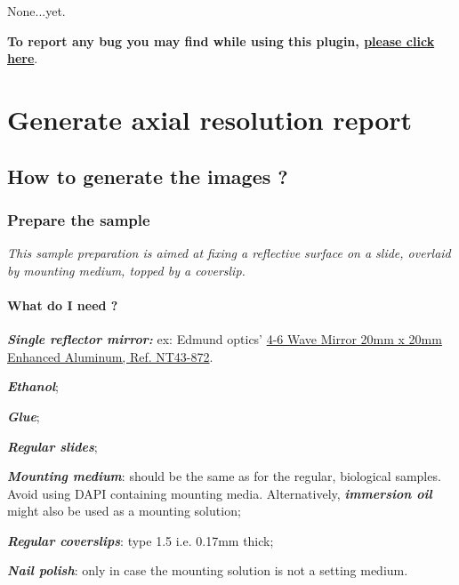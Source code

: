 \documentclass[a4paper, 11pt]{report}%
\makeatletter
\newcommand{\mailbug}{\begin{center}\textbf{To report any bug you may find while using this plugin, \href{mailto:fabrice.cordelieres@gmail.com,cedric.matthews@ibdml.univ-mrs.fr ?subject=Bug\%20found\%20in\%20MetroloJ&body=\%0ABug\%20description:\%0A\%0AHow\%20did\%20it\%20happen:\%0A\%0ACopy/Paste\%20the\%20content\%20of\%20the\%20log\%20window\%0A\%0AVersion\%20of\%20ImageJ:\%0A\%0AVersion\%20of\%20Java:}{please click here}}.\end{center}}
\makeatother
\begin{document}
None...yet.

\mailbug

\chapter{Generate axial resolution report}
\label{chap:garr}

\section{How to generate the images ?}
\label{sec:garr-what}

\subsection{Prepare the sample}
\label{sec:garr-proto}

\textit{This sample preparation is aimed at fixing a reflective surface on a slide, overlaid by mounting medium, topped by a coverslip.}

\subsubsection{What do I need ?}
\label{sec:garr-proto-what}

\begin{itemize*}
	\item \textbf{\textit{Single reflector mirror:}} ex: Edmund optics' \href{http://www.edmundoptics.com/onlinecatalog/displayproduct.cfm?productid=1754&showall}{4-6 Wave Mirror 20mm x 20mm Enhanced Aluminum, Ref. NT43-872}.
	\item \textbf{\textit{Ethanol}};
	\item \textbf{\textit{Glue}};
	\item \textbf{\textit{Regular slides}};
	\item \textbf{\textit{Mounting medium}}: should be the same as for the regular, biological samples. Avoid using DAPI containing mounting media. Alternatively, \textbf{\textit{immersion oil}} might also be used as a mounting solution;
	\item \textbf{\textit{Regular coverslips}}: type 1.5 i.e. 0.17mm thick;
	\item \textbf{\textit{Nail polish}}: only in case the mounting solution is not a setting medium.
\end{itemize*}
\end{document}
